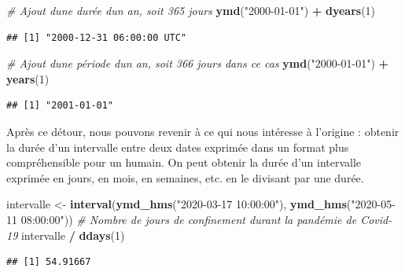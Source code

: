 \documentclass[
  11pt,
]{book}
\newenvironment{Shaded}{\begin{snugshade}}{\end{snugshade}}
\newcommand{\CommentTok}[1]{\textcolor[rgb]{0.56,0.35,0.01}{\textit{#1}}}
\newcommand{\DecValTok}[1]{\textcolor[rgb]{0.00,0.00,0.81}{#1}}
\newcommand{\KeywordTok}[1]{\textcolor[rgb]{0.13,0.29,0.53}{\textbf{#1}}}
\newcommand{\NormalTok}[1]{#1}
\newcommand{\OperatorTok}[1]{\textcolor[rgb]{0.81,0.36,0.00}{\textbf{#1}}}
\newcommand{\StringTok}[1]{\textcolor[rgb]{0.31,0.60,0.02}{#1}}
\numberwithin{equation}{section}
\numberwithin{countremarque}{section}
\begin{document}
\begin{Shaded}
\begin{Highlighting}[]
\CommentTok{\# Ajout d\textquotesingle{}une durée d\textquotesingle{}un an, soit 365 jours}
\KeywordTok{ymd}\NormalTok{(}\StringTok{"2000{-}01{-}01"}\NormalTok{) }\OperatorTok{+}\StringTok{ }\KeywordTok{dyears}\NormalTok{(}\DecValTok{1}\NormalTok{)}
\end{Highlighting}
\end{Shaded}

\begin{lstlisting}
## [1] "2000-12-31 06:00:00 UTC"
\end{lstlisting}

\begin{Shaded}
\begin{Highlighting}[]
\CommentTok{\# Ajout d\textquotesingle{}une période d\textquotesingle{}un an, soit 366 jours dans ce cas}
\KeywordTok{ymd}\NormalTok{(}\StringTok{"2000{-}01{-}01"}\NormalTok{) }\OperatorTok{+}\StringTok{ }\KeywordTok{years}\NormalTok{(}\DecValTok{1}\NormalTok{)}
\end{Highlighting}
\end{Shaded}

\begin{lstlisting}
## [1] "2001-01-01"
\end{lstlisting}

Après ce détour, nous pouvons revenir à ce qui nous intéresse à l'origine : obtenir la durée d'un intervalle entre deux dates exprimée dans un format plus compréhensible pour un humain. On peut obtenir la durée d'un intervalle exprimée en jours, en mois, en semaines, etc. en le divisant par une durée.

\begin{Shaded}
\begin{Highlighting}[]
\NormalTok{intervalle \textless{}{-}}\StringTok{ }\KeywordTok{interval}\NormalTok{(}\KeywordTok{ymd\_hms}\NormalTok{(}\StringTok{"2020{-}03{-}17 10:00:00"}\NormalTok{),}
                           \KeywordTok{ymd\_hms}\NormalTok{(}\StringTok{"2020{-}05{-}11 08:00:00"}\NormalTok{))}
\CommentTok{\# Nombre de jours de confinement durant la pandémie de Covid{-}19}
\NormalTok{intervalle }\OperatorTok{/}\StringTok{ }\KeywordTok{ddays}\NormalTok{(}\DecValTok{1}\NormalTok{)}
\end{Highlighting}
\end{Shaded}

\begin{lstlisting}
## [1] 54.91667
\end{lstlisting}
\end{document}
